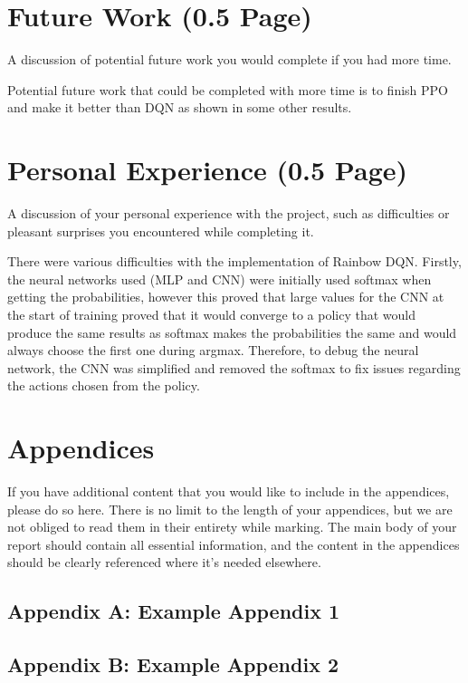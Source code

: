 \documentclass{article}
\begin{document}
\section{Future Work (0.5 Page)}
A discussion of potential future work you would complete if you had more time.

Potential future work that could be completed with more time is to finish PPO and make it better than DQN as shown in some other results.



\section{Personal Experience (0.5 Page)}
A discussion of your personal experience with the project, such as difficulties or pleasant surprises you encountered while completing it.

There were various difficulties with the implementation of Rainbow DQN.
Firstly, the neural networks used (MLP and CNN) were initially used softmax when getting the probabilities, however this proved that large values for the CNN at the start of training proved that it would converge to a policy that would produce the same results as softmax makes the probabilities the same and would always choose the first one during argmax.
Therefore, to debug the neural network, the CNN was simplified and removed the softmax to fix issues regarding the actions chosen from the policy.

\newpage
 
 

\normalsize
\newpage
\section*{Appendices}
If you have additional content that you would like to include in the appendices, please do so here.
There is no limit to the length of your appendices, but we are not obliged to read them in their entirety while marking. The main body of your report should contain all essential information, and the content in the appendices should be clearly referenced where it's needed elsewhere.
\subsection*{Appendix A: Example Appendix 1}
\subsection*{Appendix B: Example Appendix 2}
\end{document}
